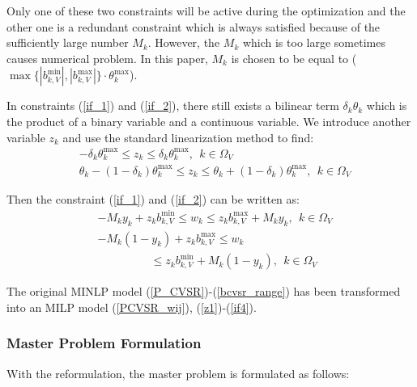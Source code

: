 \documentclass[journal]{IEEEtran}
\begin{document}
Only one of these two constraints will be active during the optimization and the other one is a redundant constraint which is always satisfied because of the sufficiently large number $M_{k}$. However, the $M_{k}$ which is too large sometimes causes numerical problem. In this paper, $M_{k}$ is chosen to be equal to ($\max\{|b_{k,V}^{\min}|,|b_{k,V}^{\max}|\} \cdot \theta_{k}^{\max}$). 

In constraints (\ref{if_1}) and (\ref{if_2}), there still exists a bilinear term $\delta_{k}\theta_{k}$ which is the product of a binary variable and a continuous variable. We introduce another variable $z_{k}$ and use the standard linearization method to find: 
\begin{align}
&-\delta_{k}\theta_{k}^{\max} \le z_{k} \le \delta_{k}\theta_{k}^{\max},\ \ k \in \Omega_{V} \label{z1} \\
&\theta_{k}-(1-\delta_{k})\theta_{k}^{\max} \le z_{k} \le \theta_{k}+(1-\delta_{k})\theta_{k}^{\max},\ \ k\in \Omega_{V}  \label{z2}
\end{align}

Then the constraint (\ref{if_1}) and (\ref{if_2}) can be written as:
\begin{align}
&-M_{k}y_{k}+z_{k}b_{k,V}^{\min} \le w_{k} \le z_{k}b_{k,V}^{\max}+M_{k}y_{k},\ \ k\in \Omega_{V} \label{if3} \\
&-M_{k}(1-y_{k})+z_{k}b_{k,V}^{\max} \le w_{k}  \nonumber \\
&\ \ \ \ \ \ \ \ \ \ \ \ \ \ \ \ \ \ \ \ \  \le z_{k}b_{k,V}^{\min}+M_{k}(1-y_{k}),\ \ k\in \Omega_{V} \label{if4} 
\end{align}

The original MINLP model (\ref{P_CVSR})-(\ref{bcvsr_range}) has been transformed into an MILP model (\ref{PCVSR_wij}), (\ref{z1})-(\ref{if4}).   

\subsubsection{Master Problem Formulation}
With the reformulation, the master problem is formulated as follows:
\end{document}

